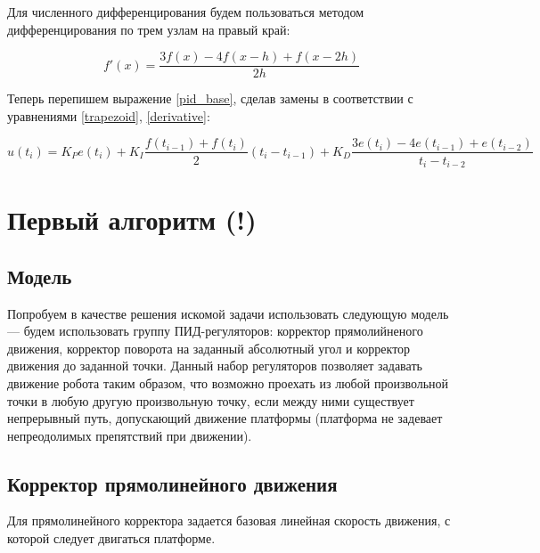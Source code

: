 \documentclass[12pt]{report}
\begin{document}
Для численного дифференцирования будем пользоваться методом дифференцирования по трем узлам на правый край:

\begin{equation}\label{derivative}
f'(x) = \frac{3f(x) - 4f(x-h) + f(x-2h)}{2h}
\end{equation}

Теперь перепишем выражение \eqref{pid_base}, сделав замены в соответствии с уравнениями \eqref{trapezoid}, \eqref{derivative}:

\begin{equation}\label{pid_digit}
u(t_i) = K_P e(t_i) + K_I \frac{f(t_{i-1}) + f(t_i)}{2}(t_i - t_{i-1}) + K_D \frac{3e(t_i) - 4e(t_{i-1}) + e(t_{i-2})}{t_i - t_{i-2}}
\end{equation}
\chapter{Первый алгоритм (!)}

\section{Модель}

Попробуем в качестве решения искомой задачи использовать следующую модель --- будем использовать группу ПИД-регуляторов: корректор прямолийненого движения, корректор поворота на заданный абсолютный угол и корректор движения до заданной точки. Данный набор регуляторов позволяет задавать движение робота таким образом, что возможно проехать из любой произвольной точки в любую другую произвольную точку, если между ними существует непрерывный путь, допускающий движение платформы (платформа не задевает непреодолимых препятствий при движении).

\section{Корректор прямолинейного движения}

Для прямолинейного корректора задается базовая линейная скорость движения, с которой следует двигаться платформе.
\end{document}
